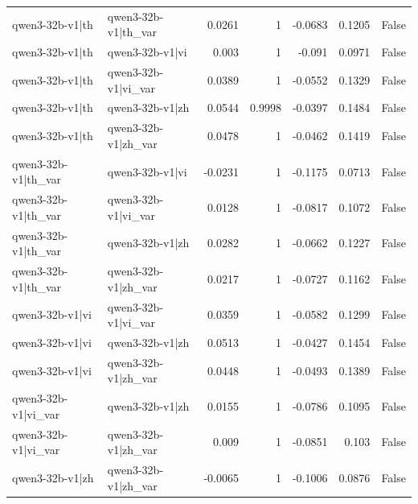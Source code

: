 \begin{table}
\begin{tabular}{l l r r r r l}
qwen3-32b-v1|th & qwen3-32b-v1|th_var & 0.0261 & 1 & -0.0683 & 0.1205 & False \\
qwen3-32b-v1|th & qwen3-32b-v1|vi & 0.003 & 1 & -0.091 & 0.0971 & False \\
qwen3-32b-v1|th & qwen3-32b-v1|vi_var & 0.0389 & 1 & -0.0552 & 0.1329 & False \\
qwen3-32b-v1|th & qwen3-32b-v1|zh & 0.0544 & 0.9998 & -0.0397 & 0.1484 & False \\
qwen3-32b-v1|th & qwen3-32b-v1|zh_var & 0.0478 & 1 & -0.0462 & 0.1419 & False \\
qwen3-32b-v1|th_var & qwen3-32b-v1|vi & -0.0231 & 1 & -0.1175 & 0.0713 & False \\
qwen3-32b-v1|th_var & qwen3-32b-v1|vi_var & 0.0128 & 1 & -0.0817 & 0.1072 & False \\
qwen3-32b-v1|th_var & qwen3-32b-v1|zh & 0.0282 & 1 & -0.0662 & 0.1227 & False \\
qwen3-32b-v1|th_var & qwen3-32b-v1|zh_var & 0.0217 & 1 & -0.0727 & 0.1162 & False \\
qwen3-32b-v1|vi & qwen3-32b-v1|vi_var & 0.0359 & 1 & -0.0582 & 0.1299 & False \\
qwen3-32b-v1|vi & qwen3-32b-v1|zh & 0.0513 & 1 & -0.0427 & 0.1454 & False \\
qwen3-32b-v1|vi & qwen3-32b-v1|zh_var & 0.0448 & 1 & -0.0493 & 0.1389 & False \\
qwen3-32b-v1|vi_var & qwen3-32b-v1|zh & 0.0155 & 1 & -0.0786 & 0.1095 & False \\
qwen3-32b-v1|vi_var & qwen3-32b-v1|zh_var & 0.009 & 1 & -0.0851 & 0.103 & False \\
qwen3-32b-v1|zh & qwen3-32b-v1|zh_var & -0.0065 & 1 & -0.1006 & 0.0876 & False \\
\bottomrule
\end{tabular}
\end{table}

